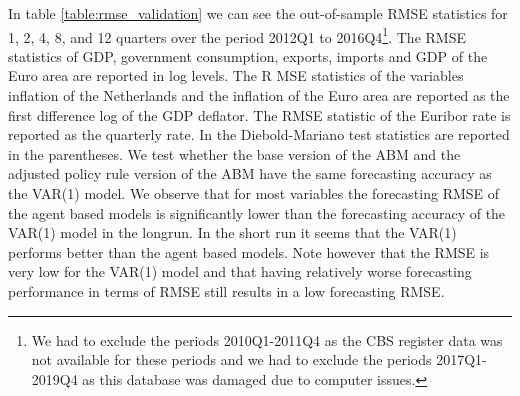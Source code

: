 In table \ref{table:rmse_validation} we can see the out-of-sample RMSE statistics for 1, 2, 4, 8, and 12 quarters over the period 2012Q1 to 2016Q4\footnote{We had to exclude the periods 2010Q1-2011Q4 as the CBS register data was not available for these periods and we had to exclude the periods 2017Q1-2019Q4 as this database was damaged due to computer issues.}. The RMSE statistics of GDP, government consumption, exports, imports and GDP of the Euro area are reported in log levels. The R MSE statistics of the variables inflation of the Netherlands and the inflation of the Euro area are reported as the first difference log of the GDP deflator. The RMSE statistic of the Euribor rate is reported as the quarterly rate. In the Diebold-Mariano test statistics are reported in the parentheses. We test whether the base version of the ABM and the adjusted policy rule version of the ABM have the same forecasting accuracy as the VAR(1) model. We observe that for most variables the forecasting RMSE of the agent based models is significantly lower than the forecasting accuracy of the VAR(1) model in the longrun. In the short run it seems that the VAR(1) performs better than the agent based models. Note however that the RMSE is very low for the VAR(1) model and that having relatively worse forecasting performance in terms of RMSE still results in a low forecasting RMSE.\\

